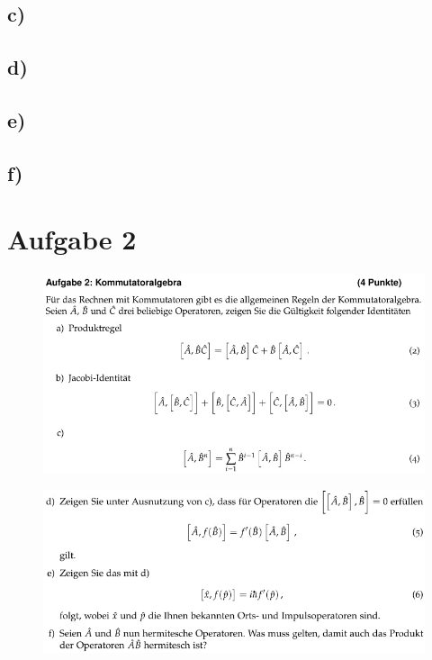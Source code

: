     \subsection{c)}

    \subsection{d)}

    \subsection{e)}

    \subsection{f)}


\section{Aufgabe 2}

    \begin{figure}[H]
        \centering
        \includegraphics[width=\textwidth]{images/Aufgabe2abc.jpg}
        \label{fig:2}
    \end{figure}

    \begin{figure}[H]
        \centering
        \includegraphics[width=\textwidth]{images/Aufgabe2def.jpg}
        \label{fig:3}
    \end{figure}

